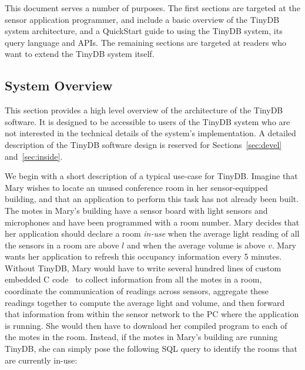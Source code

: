 \documentclass[11pt]{article}
\begin{document}
This document serves a number of purposes.  The first sections are
targeted at the sensor application programmer, and include a basic
overview of the TinyDB system architecture, and a QuickStart guide to
using the TinyDB system, its query language and APIs.  The remaining
sections are targeted at readers who want to extend the TinyDB system
itself.

\subsection{System Overview}

This section provides a high level overview of the architecture of the
TinyDB software.  It is designed to be accessible to
users of the TinyDB system who are not interested in the
technical details of the system's implementation.  A detailed
description of the TinyDB software design is reserved
for Sections~\ref{sec:devel} and~\ref{sec:inside}.

We begin with a short description of a typical use-case for TinyDB.  Imagine that Mary
wishes to locate an unused conference room in her sensor-equipped building, and
that an application to perform this task has not already been built.
The motes in Mary's
building have a sensor board with light sensors and microphones and have been programmed with
a room number.  Mary decides that her application
should declare a room {\it in-use} when the average light reading of all the sensors in a room
are above $l$ and when the average volume is above $v$.  Mary wants her application to 
refresh this occupancy information every 5 minutes.  Without TinyDB, Mary
would have to write several hundred lines of custom embedded C
code~ to collect information
from all the motes in a room, coordinate the communication of readings
across sensors,
aggregate these readings together to compute the average light
and volume, and then forward that information from within the sensor network to the PC where
the application is running.  She would then have to download her compiled
program to each of the motes in the room.  Instead, if the motes in Mary's building are running TinyDB,
she can simply pose the following SQL
query to identify the rooms that are currently in-use:
\end{document}
